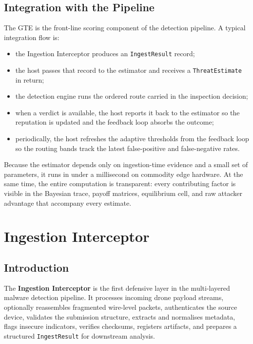 \documentclass[12pt, a4paper]{report}
\begin{document}
\section{Integration with the Pipeline}

The GTE is the front-line scoring component of the detection pipeline.
A typical integration flow is:
\begin{itemize}
    \item the Ingestion Interceptor produces an
          \texttt{IngestResult} record;
    \item the host passes that record to the estimator and receives
          a \texttt{ThreatEstimate} in return;
    \item the detection engine runs the ordered route carried in
          the inspection decision;
    \item when a verdict is available, the host reports it back to
          the estimator so the reputation is updated and the feedback
          loop absorbs the outcome;
    \item periodically, the host refreshes the adaptive thresholds
          from the feedback loop so the routing bands track the
          latest false-positive and false-negative rates.
\end{itemize}

Because the estimator depends only on ingestion-time evidence and a
small set of parameters, it runs in under a millisecond on commodity
edge hardware. At the same time, the entire computation is
transparent: every contributing factor is visible in the Bayesian
trace, payoff matrices, equilibrium cell, and raw attacker advantage
that accompany every estimate.

\cleardoublepage


\chapter{Ingestion Interceptor}
\label{chap:ingestion_interceptor}

\section{Introduction}

The \textbf{Ingestion Interceptor} is the first defensive layer in the
multi-layered malware detection pipeline. It processes incoming drone
payload streams, optionally reassembles fragmented wire-level packets,
authenticates the source device, validates the submission structure,
extracts and normalises metadata, flags insecure indicators, verifies
checksums, registers artifacts, and prepares a structured \texttt{IngestResult}
for downstream analysis.
\end{document}
